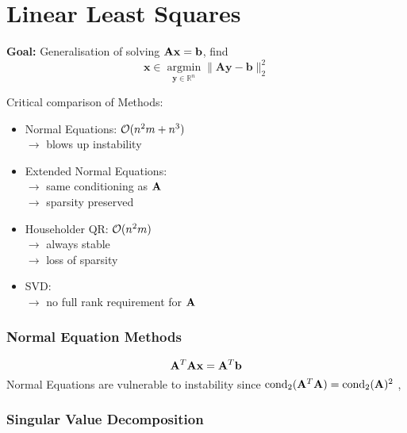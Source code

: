 \part{Linear Least Squares}
\setcounter{section}{0}
\textbf{Goal:} Generalisation of solving $\mathbf{A}\mathbf{x}=\mathbf{b}$, find
$$
\mathbf{x} \in \underset{\mathbf{y} \in \mathbb{R}^{n}}{\operatorname{argmin}}\|\mathbf{A} \mathbf{y}-\mathbf{b}\|_{2}^{2}
$$

Critical comparison of Methods:
\begin{itemize}
  \item Normal Equations: $\mathcal{O}(n^2 m + n^3)$ \\
  	$\rightarrow$ blows up instability
  \item Extended Normal Equations:  \\
  	$\rightarrow$ same conditioning as $\mathbf{A}$ \\
  	$\rightarrow$ sparsity preserved
  \item Householder QR: $\mathcal{O}(n^2 m)$ \\
  	$\rightarrow$ always stable \\
  	$\rightarrow$ loss of sparsity
  \item SVD:  \\
  	$\rightarrow$ no full rank requirement for $\mathbf{A}$ \\
\end{itemize}

\section{Normal Equation Methods}
$$ \mathbf{A}^T \mathbf{A} \mathbf{x} = \mathbf{A}^T \mathbf{b}$$
\Warning Normal Equations are vulnerable to instability since $\operatorname{cond}_2(\mathbf{A}^T \mathbf{A}) = \operatorname{cond}_2(\mathbf{A})^2$
\sep



\section{Singular Value Decomposition}

